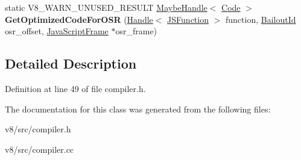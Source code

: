 \begin{DoxyCompactItemize}
\item 
\mbox{\label{classv8_1_1internal_1_1Compiler_a4f21f1972ec31d424fe031636384b386}} 
static V8\+\_\+\+W\+A\+R\+N\+\_\+\+U\+N\+U\+S\+E\+D\+\_\+\+R\+E\+S\+U\+LT \mbox{\hyperlink{classv8_1_1internal_1_1MaybeHandle}{Maybe\+Handle}}$<$ \mbox{\hyperlink{classv8_1_1internal_1_1Code}{Code}} $>$ {\bfseries Get\+Optimized\+Code\+For\+O\+SR} (\mbox{\hyperlink{classv8_1_1internal_1_1Handle}{Handle}}$<$ \mbox{\hyperlink{classv8_1_1internal_1_1JSFunction}{J\+S\+Function}} $>$ function, \mbox{\hyperlink{classv8_1_1internal_1_1BailoutId}{Bailout\+Id}} osr\+\_\+offset, \mbox{\hyperlink{classv8_1_1internal_1_1JavaScriptFrame}{Java\+Script\+Frame}} $\ast$osr\+\_\+frame)
\end{DoxyCompactItemize}


\subsection{Detailed Description}


Definition at line 49 of file compiler.\+h.



The documentation for this class was generated from the following files\+:\begin{DoxyCompactItemize}
\item 
v8/src/compiler.\+h\item 
v8/src/compiler.\+cc\end{DoxyCompactItemize}
